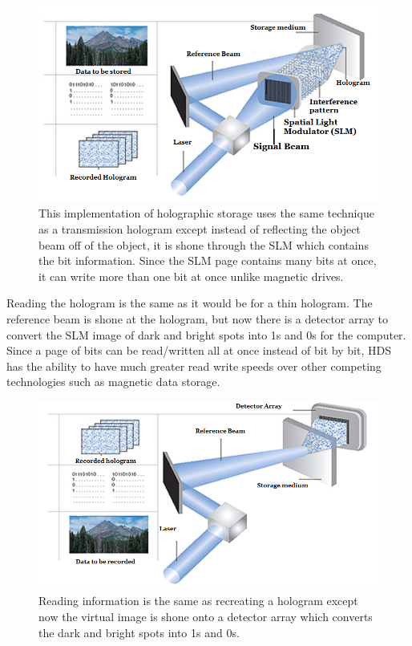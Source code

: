 \documentclass[ notitlepage, numerical, 11pt]{revtex4-1} %
\begin{document}
\begin{figure}[H]
\centerline{\includegraphics[scale=.45]{dataHologramCreate.png}}
\caption{This implementation of holographic storage uses the same technique as a transmission hologram except instead of reflecting the object beam off of the object, it is shone through the SLM which contains the bit information. Since the SLM page contains many bits at once, it can write more than one bit at once unlike magnetic drives.}
\label{dataHologramCreate}
\end{figure} 
Reading the hologram is the same as it would be for a thin hologram. The reference beam is shone at the hologram, but now there is a detector array to convert the SLM image of dark and bright spots into 1s and 0s for the computer. Since a page of bits can be read/written all at once instead of bit by bit, HDS has the ability to have much greater read write speeds over other competing technologies such as magnetic data storage.
\begin{figure}[H]
\centerline{\includegraphics[scale=.45]{dataHologramReconstruct.png}}
\caption{Reading information is the same as recreating a hologram except now the virtual image is shone onto a detector array which converts the dark and bright spots into 1s and 0s.}
\label{dataHologramReconstruct}
\end{figure} 
\end{document}
